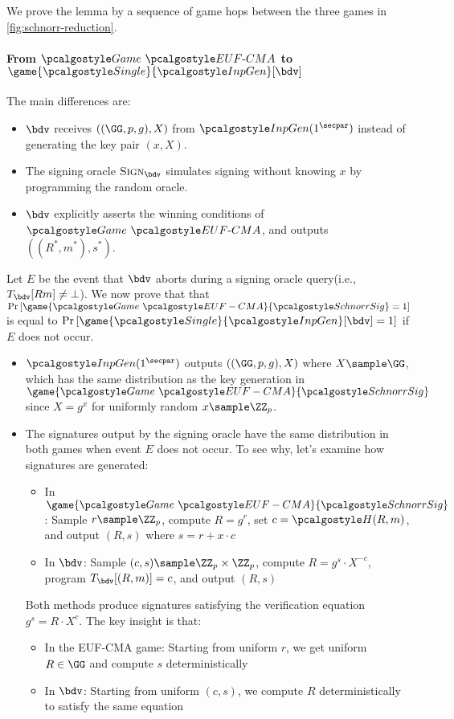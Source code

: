 \ifsolutions
\begin{mysolution}
  We prove the lemma by a sequence of game hops between the three games in \autoref{fig:schnorr-reduction}.

  \paragraph{From $\Game~\algo{EUF\text{-}CMA}$ to $\game{\algo{Single}}{\algo{InpGen}}[\bdv]$}
  The main differences are:
  \begin{itemize}
    \item $\bdv$ receives $((\GG, p, g), X)$ from $\algo{InpGen}(1^\secpar)$ instead of generating the key pair $(x, X)$.
    \item The signing oracle $\pcoracle{Sign}_{\bdv}$ simulates signing without knowing $x$ by programming the random oracle.
    \item $\bdv$ explicitly asserts the winning conditions of $\Game~\algo{EUF\text{-}CMA}$, and outputs $((R^*, m^*), s^*)$.
  \end{itemize}

  Let $E$ be the event that $\bdv$ aborts during a signing oracle query(i.e., $T_{\bdv}[R  m] \neq \bot$).
  We now prove that that $\pr{\game{\Game~\algo{EUF-CMA}}{\algo{SchnorrSig}} = 1}$ is equal to $\pr{\game{\algo{Single}}{\algo{InpGen}}[\bdv] = 1}$ if $E$ does not occur.
  \begin{itemize}
    \item $\algo{InpGen}(1^\secpar)$ outputs $((\GG, p, g), X)$ where $X \sample \GG$, which has the same distribution as the key generation in $\game{\Game~\algo{EUF-CMA}}{\algo{SchnorrSig}}$ since $X = g^x$ for uniformly random $x \sample \ZZ_p$.
    \item The signatures output by the signing oracle have the same distribution in both games when event $E$ does not occur. To see why, let's examine how signatures are generated:
    \begin{itemize}
      \item In $\game{\Game~\algo{EUF-CMA}}{\algo{SchnorrSig}}$: Sample $r \sample \ZZ_p$, compute $R = g^r$, set $c = \algo{H}(R, m)$, and output $(R,
  s)$ where $s = r + x \cdot c$
      \item In $\bdv$: Sample $(c, s) \sample \ZZ_p \times \ZZ_p$, compute $R = g^s \cdot X^{-c}$, program $T_{\bdv}[(R, m)] = c$, and output $(R, s)$
    \end{itemize}

    Both methods produce signatures satisfying the verification equation $g^s = R \cdot X^c$. The key insight is that:
    \begin{itemize}
      \item In the EUF-CMA game: Starting from uniform $r$, we get uniform $R \in \GG$ and compute $s$ deterministically
      \item In $\bdv$: Starting from uniform $(c, s)$, we compute $R$ deterministically to satisfy the same equation
    \end{itemize}


\end{itemize}
\end{mysolution}
